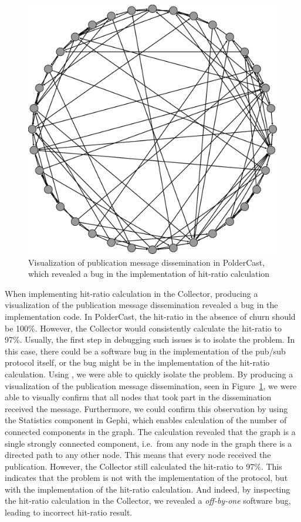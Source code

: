 \begin{figure}[ht!]
    \centering
    \includegraphics[width=\linewidth]{figures/hitratiobug}
    \caption{Visualization of publication message dissemination in
        PolderCast, which revealed a bug in the implementation of hit-ratio
        calculation}
   \label{fig:hitratiobug}
\end{figure}

When implementing hit-ratio calculation in the Collector, producing a
visualization of the publication message dissemination revealed a bug in the implementation code.
In PolderCast, the hit-ratio in the absence of churn should be 100\%.
However, the Collector would consistently calculate the hit-ratio to
97\%. Usually, the first step in debugging such issues is to isolate the
problem. In this case, there could be a software bug in the
implementation of the pub/sub protocol itself, or the bug might be in
the implementation of the hit-ratio calculation. Using \demo, we were
able to quickly isolate the problem. By producing a visualization of the
publication message dissemination, seen in Figure~\ref{fig:hitratiobug},
we were able to visually confirm that all nodes that took part in the dissemination
received the message. Furthermore, we could confirm this observation by
using the Statistics component in Gephi, which enables calculation of
the number of connected components in the graph.  The calculation
revealed that the graph is a single strongly connected component, i.e.\
from any node in the graph there is a directed path to any other node.
This means that every node received the publication.  However, the
Collector still calculated the hit-ratio to 97\%. This indicates that
the problem is not with the implementation of the protocol, but with the
implementation of the hit-ratio calculation. And indeed, by inspecting
the hit-ratio calculation in the Collector, we revealed a
\emph{off-by-one} software bug, leading to incorrect hit-ratio result.

